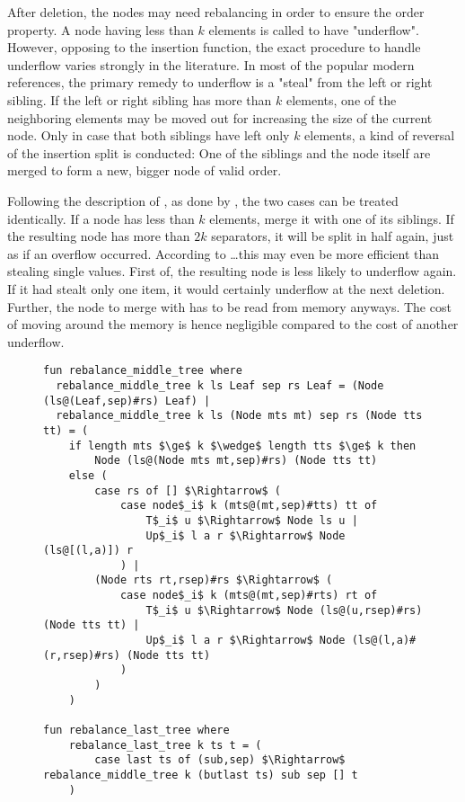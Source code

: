 After deletion, the nodes may need rebalancing in order
to ensure the order property.
A node having less than $k$ elements is called to have "underflow".
However, opposing to the insertion function,
the exact procedure to handle underflow varies strongly in the literature.
In most of the popular modern references, %
the primary remedy to underflow is a "steal"
from the left or right sibling.\parencite{DBLP:books/daglib/0023376}
If the left or right sibling has more than $k$ elements,
one of the neighboring elements may be moved out for increasing
the size of the current node.
Only in case that both siblings have left only $k$ elements,
a kind of reversal of the insertion split is conducted:
One of the siblings and the node itself are merged to form
a new, bigger node of valid order.

Following the description of \parencite{DBLP:journals/acta/BayerM72},
as done by \parencite{Fielding80},
the two cases can be treated identically.
If a node has less than $k$ elements,
merge it with one of its siblings.
If the resulting node has more than $2k$ separators,
it will be split in half again, just as if an overflow occurred.
According to \dots this may even be more efficient than stealing single values.
First of, the resulting node is less likely to underflow again.
If it had stealt only one item, it would certainly underflow at the next
deletion.
Further, the node to merge with has to be read from memory anyways.
The cost of moving around the memory
is hence negligible compared to the cost of another underflow.


\begin{figure}
\begin{lstlisting}[mathescape=true, language=Isabelle,label={lst:rebalance-def},
    caption={The rebalancing functions}]
fun rebalance_middle_tree where
  rebalance_middle_tree k ls Leaf sep rs Leaf = (Node (ls@(Leaf,sep)#rs) Leaf) |
  rebalance_middle_tree k ls (Node mts mt) sep rs (Node tts tt) = (
    if length mts $\ge$ k $\wedge$ length tts $\ge$ k then
        Node (ls@(Node mts mt,sep)#rs) (Node tts tt)
    else (
        case rs of [] $\Rightarrow$ (
            case node$_i$ k (mts@(mt,sep)#tts) tt of
                T$_i$ u $\Rightarrow$ Node ls u |
                Up$_i$ l a r $\Rightarrow$ Node (ls@[(l,a)]) r
            ) |
        (Node rts rt,rsep)#rs $\Rightarrow$ (
            case node$_i$ k (mts@(mt,sep)#rts) rt of
                T$_i$ u $\Rightarrow$ Node (ls@(u,rsep)#rs) (Node tts tt) |
                Up$_i$ l a r $\Rightarrow$ Node (ls@(l,a)#(r,rsep)#rs) (Node tts tt)
            )
        )
    )

fun rebalance_last_tree where
    rebalance_last_tree k ts t = (
        case last ts of (sub,sep) $\Rightarrow$ rebalance_middle_tree k (butlast ts) sub sep [] t
    )
\end{lstlisting}
\end{figure}

